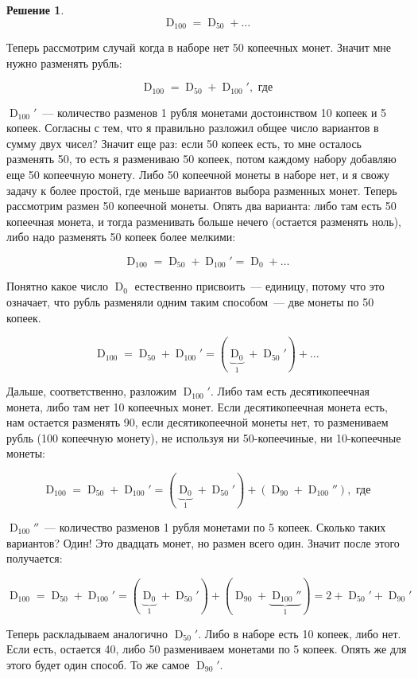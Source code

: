 \documentclass[russian]{lecture-notes}
\theoremstyle{definition}
\newtheorem*{solution}{Решение}
\DeclareMathOperator{\KRAZ}{D}
\newcommand{\DN}[1]{\KRAZ_{#1}}
\begin{document}
\begin{enumerate}
\begin{solution}
			\[
				\DN{100} = \DN{50} + \ldots
			\]
			
			Теперь рассмотрим случай когда в наборе нет 50 копеечных монет. Значит мне нужно разменять рубль:
			
			\[
				\DN{100} = \DN{50} + \DN{100}', \text{ где}
			\]
			
			 $\DN{100}'$~--- количество разменов 1 рубля монетами достоинством 10 копеек и 5 копеек. Согласны с тем, что я правильно разложил общее число вариантов в сумму двух чисел? Значит еще раз: если 50 копеек есть, то мне осталось разменять 50, то есть я размениваю 50 копеек, потом каждому набору добавляю еще 50 копеечную монету. Либо 50 копеечной монеты в наборе нет, и я свожу задачу к более простой, где меньше вариантов выбора разменных монет. Теперь рассмотрим размен 50 копеечной монеты. Опять два варианта: либо там есть 50 копеечная монета, и тогда разменивать больше нечего (остается разменять ноль), либо надо разменять 50 копеек более мелкими:
			 
			 \[
			 	\DN{100} = \DN{50} + \DN{100}' = \DN{0} + \ldots
			 \]
			 
			 Понятно какое число $\DN{0}$ естественно присвоить~--- единицу, потому что это означает, что рубль разменяли одним таким способом~--- две монеты по 50 копеек.
			 
			 \[
			 	\DN{100} = \DN{50} + \DN{100}' = (\underbrace{\DN{0}}_{1} + \DN{50}') + \ldots
			 \]
			 
			 Дальше, соответственно, разложим $\DN{100}'$. Либо там есть десятикопеечная монета, либо там нет 10 копеечных монет. Если десятикопеечная монета есть, нам остается разменять 90, если десятикопеечной монеты нет, то размениваем рубль (100 копеечную монету), не используя ни 50-копеечиные, ни 10-копеечные монеты:
			 
			 \[
			 	\DN{100} = \DN{50} + \DN{100}' = (\underbrace{\DN{0}}_{1} + \DN{50}') + (\DN{90} + \DN{100}''), \text{ где}
			 \]
			 
			 $\DN{100}''$~--- количество разменов 1 рубля монетами по 5 копеек. Сколько таких вариантов? Один! Это двадцать монет, но размен всего один. Значит после этого получается:
			 
			 \[
				 \DN{100} = \DN{50} + \DN{100}' = (\underbrace{\DN{0}}_{1} + \DN{50}') + (\DN{90} + \underbrace{\DN{100}''}_{1}) = 2 + \DN{50}' + \DN{90}'
			 \]
			 
			 Теперь раскладываем аналогично $\DN{50}'$. Либо в наборе есть 10 копеек, либо нет. Если есть, остается 40, либо 50 размениваем монетами по 5 копеек. Опять же для этого будет один способ. То же самое $\DN{90}'$.
			 

\end{solution}
\end{enumerate}
\end{document}
